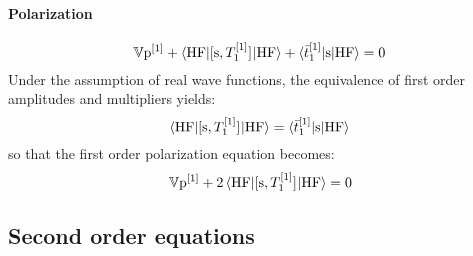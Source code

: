 \paragraph*{Polarization}
\begin{equation}%
  \V\p^{[1]} + \braket{\mathrm{HF} | \commutator{\s}{T_1^{[1]}}| \mathrm{HF}}
  + \braket{\tbar{1}^{[1]} | \s | \mathrm{HF} } = 0
\end{equation}
Under the assumption of real wave functions, the equivalence of
first order amplitudes and multipliers yields:
\begin{equation}
  \braket{\mathrm{HF} | [ \mathrm{s}, T_1^{[1]} ]^{}| \mathrm{HF}}
  = \braket{\bar{t}_{1}^{[1]} | \mathrm{s} | \mathrm{HF}}
\end{equation}
so that the first order polarization equation becomes:
\begin{equation}\label{eq:1st-order-pol}
  \mathbb{V}\mathrm{p}^{[1]} + 2\braket{\mathrm{HF} | [ \mathrm{s}, T_1^{[1]} ]^{}| \mathrm{HF}} = 0
\end{equation}

\begin{comment}
\begin{equation}
  \begin{aligned}
  \braket{\mathrm{HF} | \commutator{\s}{T_1^{[1]}}| \mathrm{HF}}
  &= \left/ \text{Expand commutator}, T_1^{[1]} = \sum_{\mu_1}\ket{\mu_1}\tamp{\mu_1} \right/
  =
  \sum_{\mu_1}\braket{\mathrm{HF}|\s|\mu_1}\tamp{\mu_1}^{[1]} \\
  &= \left/ \text{Complex conjugation and real wave functions} \right/ \\
  &= \sum_{\mu_1}\tbar{\mu_1}^{[1]}\braket{\mu_1 | \s | \mathrm{HF}} \\
  &= \left/
  \bra{\tbar{1}^{[1]}} = \sum_{\mu_1}\tbar{\mu_1}^{[1]}\bra{\mu_1} \right/
  = \braket{\tbar{1}^{[1]} | \s | \mathrm{HF}}
 \end{aligned}
\end{equation}
\end{comment}

\subsection{Second order equations}\label{sec:second-order-pt}


